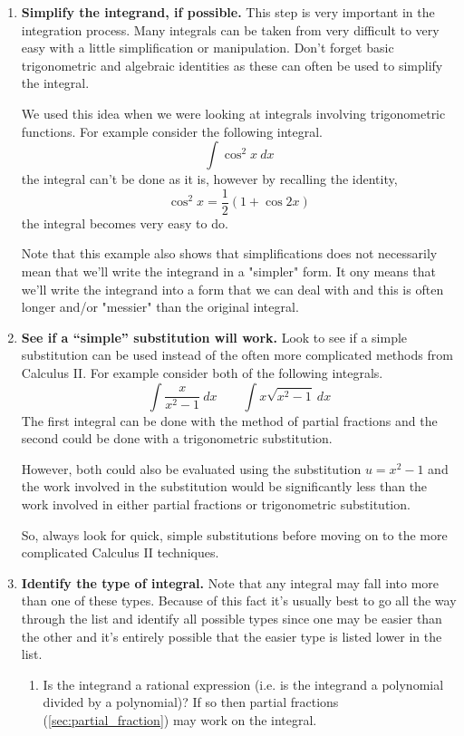\begin{enumerate}
\item \textbf{Simplify the integrand, if possible.} This step is very important in the integration process. Many integrals can be taken from very difficult to very easy with a little simplification or manipulation. Don't forget basic trigonometric and algebraic identities as these can often be used to simplify the integral.

We used this idea when we were looking at integrals involving trigonometric functions. For example consider the following integral.
\[\int \cos^2 x\ dx\]
the integral can't be done as it is, however by recalling the identity,
\[\cos^2 x = \frac{1}{2}(1 + \cos 2x)\]
the integral becomes very easy to do.

Note that this example also shows that simplifications does not necessarily mean that we'll write the integrand in a "simpler" form. It ony means that we'll write the integrand into a form that we can deal with and this is often longer and/or "messier" than the original integral.

\item \textbf{See if a ``simple'' substitution will work.} Look to see if a simple substitution can be used instead of the often more complicated methods from Calculus II. For example consider both of the following integrals.
\[\int \frac{x}{x^2-1}\ dx \qquad \int x\sqrt{x^2 -1}\ dx\]
The first integral can be done with the method of partial fractions and the second could be done with a trigonometric substitution.

However, both could also be evaluated using the substitution $u=x^2 -1$ and the work involved in the substitution would be significantly less than the work involved in either partial fractions or trigonometric substitution.

So, always look for quick, simple substitutions before moving on to the more complicated Calculus II techniques.

\item \textbf{Identify the type of integral.} Note that any integral may fall into more than 
one of these types. Because of this fact it's usually best to go all the way through the list and identify all possible types since one may be easier than the other and it's entirely possible that the easier type is listed lower in the list.

\begin{enumerate}%
\item Is the integrand a rational expression (i.e. is the integrand a polynomial divided by a polynomial)? If so then partial fractions (\autoref{sec:partial_fraction}) may work on the integral.


\end{enumerate}
\end{enumerate}
